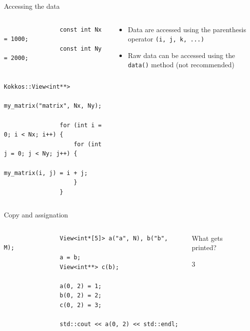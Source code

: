 \documentclass[
    aspectratio=169,
]{beamer}
\begin{document}
\begin{frame}[fragile]{Accessing the data}
    \begin{columns}
        \begin{column}{0.6\linewidth}
            \begin{verbatim}
                const int Nx = 1000;
                const int Ny = 2000;

                Kokkos::View<int**>
                    my_matrix("matrix", Nx, Ny);

                for (int i = 0; i < Nx; i++) {
                    for (int j = 0; j < Ny; j++) {
                        my_matrix(i, j) = i + j;
                    }
                }
            \end{verbatim}
        \end{column}
        \begin{column}{0.4\linewidth}
            \begin{itemize}
                \item Data are accessed using the parenthesis operator \texttt{(i, j, k, ...)}
                \item Raw data can be accessed using the \texttt{data()} method (not recommended)
            \end{itemize}
        \end{column}
    \end{columns}
\end{frame}


\begin{frame}[fragile]{Copy and assignation}
    \begin{columns}
        \begin{column}{0.6\linewidth}
            \begin{verbatim}
                View<int*[5]> a("a", N), b("b", M);
                a = b;
                View<int**> c(b);

                a(0, 2) = 1;
                b(0, 2) = 2;
                c(0, 2) = 3;

                std::cout << a(0, 2) << std::endl;
            \end{verbatim}
        \end{column}
        \begin{column}{0.4\linewidth}
             What gets printed?

            \pause

             3
        \end{column}
    \end{columns}
\end{frame}
\end{document}
